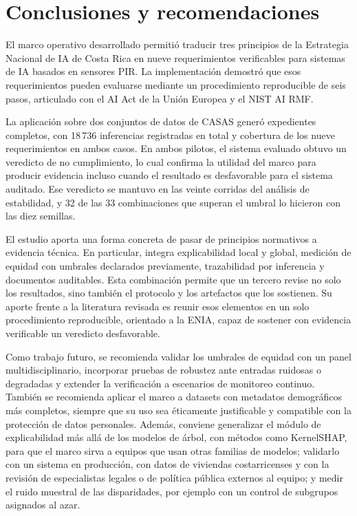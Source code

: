 
\section{Conclusiones y recomendaciones}

El marco operativo desarrollado permitió traducir tres principios de la
Estrategia Nacional de IA de Costa Rica en nueve requerimientos verificables
para sistemas de IA basados en sensores PIR. La implementación demostró que esos
requerimientos pueden evaluarse mediante un procedimiento reproducible de seis
pasos, articulado con el AI Act de la Unión Europea y el NIST AI RMF.

La aplicación sobre dos conjuntos de datos de CASAS generó expedientes
completos, con 18\,736 inferencias registradas en total y cobertura de los
nueve requerimientos en ambos casos. En ambos pilotos, el sistema evaluado obtuvo un
veredicto de no cumplimiento, lo cual confirma la utilidad del marco para
producir evidencia incluso cuando el resultado es desfavorable para el sistema
auditado. Ese veredicto se mantuvo en las veinte corridas del análisis de
estabilidad, y 32 de las 33 combinaciones que superan el umbral lo hicieron con las
diez semillas.

El estudio aporta una forma concreta de pasar de principios normativos a
evidencia técnica. En particular, integra explicabilidad local y global,
medición de equidad con umbrales declarados previamente, trazabilidad por
inferencia y documentos auditables. Esta combinación permite que un tercero
revise no solo los resultados, sino también el protocolo y los artefactos que
los sostienen. Su aporte frente a la literatura revisada es reunir esos elementos
en un solo procedimiento reproducible, orientado a la ENIA, capaz de sostener con
evidencia verificable un veredicto desfavorable.

Como trabajo futuro, se recomienda validar los umbrales de equidad con un panel
multidisciplinario, incorporar pruebas de robustez ante entradas ruidosas o
degradadas y extender la verificación a escenarios de monitoreo continuo. También se
recomienda aplicar el marco a datasets con metadatos demográficos más
completos, siempre que su uso sea éticamente justificable y compatible con la
protección de datos personales. Además, conviene generalizar el módulo de
explicabilidad más allá de los modelos de árbol, con métodos como KernelSHAP, para
que el marco sirva a equipos que usan otras familias de modelos; validarlo con un
sistema en producción, con datos de viviendas costarricenses y con la revisión de especialistas legales o de política
pública externos al equipo; y medir el ruido muestral de las disparidades, por
ejemplo con un control de subgrupos asignados al azar.
